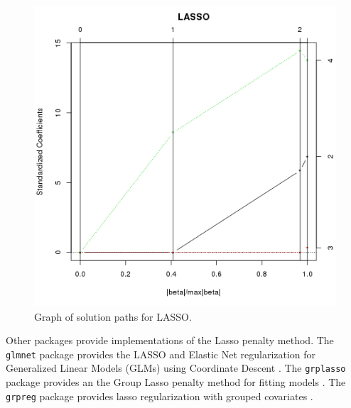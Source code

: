 

\begin{figure}[htp]
\centering
\includegraphics[scale=0.60]{a_regularization/lasso_result.png}
\caption{Graph of solution paths for LASSO.}
\label{plot:lasso_result}
\end{figure}

Other packages provide implementations of the Lasso penalty method.
The \texttt{glmnet} package provides the LASSO and Elastic Net regularization for Generalized Linear Models (GLMs) using Coordinate Descent \cite{Friedman2011}.
The \texttt{grplasso} package provides an the Group Lasso penalty method for fitting models \cite{Meier2009}.
The \texttt{grpreg} package provides lasso regularization with grouped covariates \cite{Brehen2011}.


